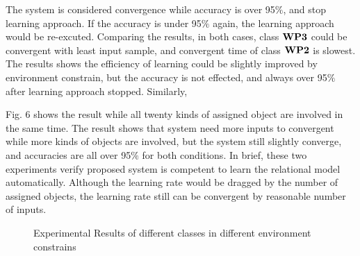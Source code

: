 \documentclass[journal]{IEEEtran}
\begin{document}
The system is considered convergence while accuracy is over 95$\%$, and stop learning approach. If the accuracy is under 95$\%$ again, the learning approach would be re-excuted. Comparing the results, in both cases, class $\bf{WP3}$ could be convergent with least input sample, and convergent time of class $\bf{WP2}$ is slowest. The results shows the efficiency of learning could be slightly improved by environment constrain, but the accuracy is not effected, and always over 95$\%$ after learning approach stopped. Similarly, 
 
Fig. 6 shows the result while all twenty kinds of assigned object are involved in the same time. The result shows that system need more inputs to convergent while more kinds of objects are involved, but the system still slightly converge, and accuracies are all over 95$\%$ for both conditions. In brief, these two experiments verify proposed system is competent to learn the relational model automatically. Although the learning rate would be dragged by the number of assigned objects, the learning rate still can be convergent by reasonable number of inputs. 


 
\begin{figure}[!t]
\centering


\caption{Experimental Results of different classes in different environment constrains}

\end{figure}
\end{document}
